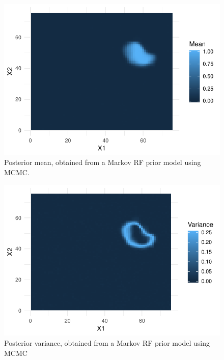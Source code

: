 \begin{figure}
    \centering
    \includegraphics[scale=0.95]{figures/c_mean.pdf}
    \caption{Posterior mean, obtained from a Markov RF prior model using MCMC.}
    \label{fig:MCMC_mean}
\end{figure}

\begin{figure}
    \centering
    \includegraphics[scale=0.95]{figures/c_variance.pdf}
    \caption{Posterior variance, obtained from a Markov RF prior model using MCMC}
    \label{fig:MCMC_var}
\end{figure}


